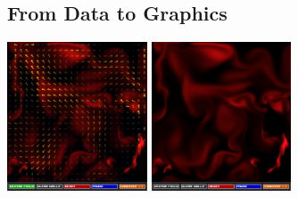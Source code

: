 \documentclass{article}
\begin{document}
\begin{multicols}{2}
\subsection{From Data to Graphics}%
%
\begin{center}
    \begin{minipage}{\linewidth}
        \includegraphics[width=4.15cm]{every_8th_field}
        \includegraphics[width=4.15cm]{no_field}
    \end{minipage}%
\end{center}%
\noindent

\end{multicols}
\end{document}
